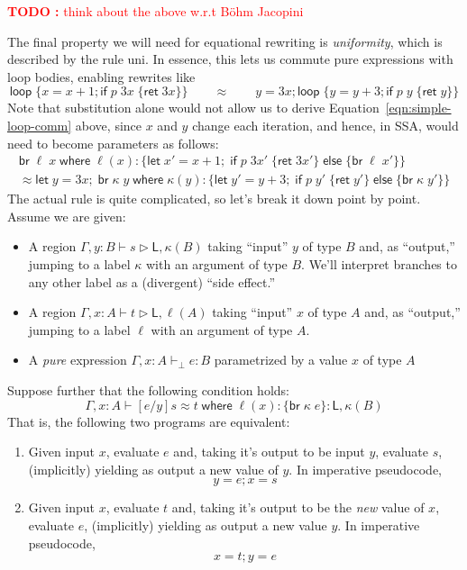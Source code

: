 \documentclass[acmsmall,screen,review]{acmart}
\newcounter{todos}
\newcommand{\TODO}[1]{{
  \stepcounter{todos}
  \begin{center}\large{\textcolor{red}{\textbf{TODO \arabic{todos}:} #1}}\end{center}
}}
\newcommand{\ms}[1]{\ensuremath{\mathsf{#1}}}
\newcommand{\lto}{:}
\newcommand{\letexpr}[3]{\ensuremath{\ms{let}\;#1 = #2;\;#3}}
\newcommand{\brb}[2]{\ms{br}\;#1\;#2}
\newcommand{\where}[2]{#1\;\ms{where}\;#2}
\newcommand{\wbranch}[3]{#1(#2) \lto \{#3\}}
\newcommand{\bhyp}[2]{#1 : #2}
\newcommand{\hasty}[4]{#1 \vdash_{#2} #3: {#4}}
\newcommand{\haslb}[3]{#1 \vdash #2 \rhd #3}
\newcommand{\teqv}{\approx}
\newcommand{\lbeq}[4]{#1 \vdash #2 \teqv #3 : {#4}}
\newcommand{\brle}[1]{{\scriptsize\textsf{#1}}}
\begin{document}
\TODO{think about the above w.r.t B\"ohm Jacopini}

The final property we will need for equational rewriting is \emph{uniformity}, which is described by
the rule \brle{uni}. In essence, this lets us commute pure expressions with loop bodies, enabling
rewrites like
\begin{equation}
  \ms{loop}\;\{ x = x + 1; \ms{if}\;p\;3x\;\{\ms{ret}\;3x\} \}
  \qquad \teqv \qquad 
  y = 3x; \ms{loop}\;\{ y = y + 3; \ms{if}\;p\;y\;\{\ms{ret}\;y\} \}
  \label{eqn:simple-loop-comm} 
\end{equation}
Note that substitution alone would not allow us to derive Equation~\ref{eqn:simple-loop-comm} above,
since $x$ and $y$ change each iteration, and hence, in SSA, would need to become parameters as
follows:
\begin{multline}
  \where{\brb{\ell}{x}}{\wbranch{\ell}{x}
    {\letexpr{x'}{x + 1}{\ms{if}\;p\;3x'\;\{\ms{ret}\;3x'\}\;\ms{else}\;\{\brb{\ell}{x'}\}}}}
  \\ \teqv
  \where{\letexpr{y}{3x}{\brb{\kappa}{y}}}{\wbranch{\kappa}{y}
    {\letexpr{y'}{y + 3}{\ms{if}\;p\;y'\;\{\ms{ret}\;y'\}\;\ms{else}\;\{\brb{\kappa}{y'}\}}}}
\end{multline}
The actual rule is quite complicated, so let's break it down point by point. Assume we are given:
\begin{itemize}
  \item A region $\haslb{\Gamma, \bhyp{y}{B}}{s}{\ms{L}, \kappa(B)}$ taking ``input'' $y$ of type
    $B$ and, as ``output,'' jumping to a label $\kappa$ with an argument of type $B$. We'll
    interpret branches to any other label as a (divergent) ``side effect.''
  \item A region $\haslb{\Gamma, \bhyp{x}{A}}{t}{\ms{L}, \ell(A)}$ taking ``input'' $x$ of type
    $A$ and, as ``output,'' jumping to a label $\ell$ with an argument of type $A$.
  \item A \emph{pure} expression $\hasty{\Gamma, \bhyp{x}{A}}{\bot}{e}{B}$ parametrized by a value
    $x$ of type $A$
\end{itemize}
Suppose further that the following condition holds:
$$
  \lbeq{\Gamma, \bhyp{x}{A}}{[e/y]s}{\where{t}{\wbranch{\ell}{x}{\brb{\kappa}{e}}}}
    {\ms{L}, \kappa(B)}
$$
That is, the following two programs are equivalent:
\begin{enumerate}[label=(\alph*)]
  \item Given input $x$, evaluate $e$ and, taking it's output to be input $y$, evaluate $s$,
  (implicitly) yielding as output a new value of $y$. In imperative pseudocode,
  $$
    y = e; x = s
  $$
  \item Given input $x$, evaluate $t$ and, taking it's output to be the \emph{new} value of $x$,
  evaluate $e$, (implicitly) yielding as output a new value $y$. In imperative pseudocode,
  $$
    x = t; y = e
  $$
\end{enumerate}
\end{document}
